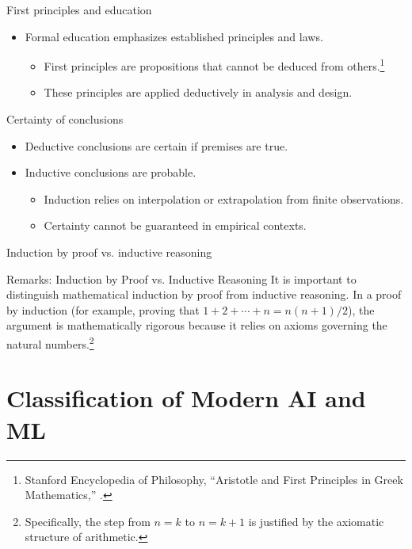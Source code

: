 \documentclass[12pt]{beamer}
\begin{document}
\begin{frame}{First principles and education}
  \begin{itemize}
    \item Formal education emphasizes established principles and laws.
      \begin{itemize}
        \item First principles are propositions that cannot be deduced from others.\footnote{Stanford Encyclopedia of Philosophy, ``Aristotle and First Principles in Greek Mathematics,'' .}
        \item These principles are applied deductively in analysis and design.
      \end{itemize}
  \end{itemize}
\end{frame}

\begin{frame}{Certainty of conclusions}
  \begin{itemize}
    \item Deductive conclusions are certain if premises are true.
    \item Inductive conclusions are probable.
      \begin{itemize}
        \item Induction relies on interpolation or extrapolation from finite observations.
        \item Certainty cannot be guaranteed in empirical contexts.
      \end{itemize}
  \end{itemize}
\end{frame}

\begin{frame}{Induction by proof vs. inductive reasoning}
  \begin{examplebox}{Remarks: Induction by Proof vs. Inductive Reasoning}
    It is important to distinguish mathematical induction by proof from inductive reasoning. In a proof by induction (for example, proving that $1 + 2 + \cdots + n = n(n+1)/2$), the argument is mathematically rigorous because it relies on axioms governing the natural numbers.\footnote{Specifically, the step from $n = k$ to $n = k+1$ is justified by the axiomatic structure of arithmetic.}
  \end{examplebox}
\end{frame}



\section{Classification of Modern AI and ML}
\end{document}
